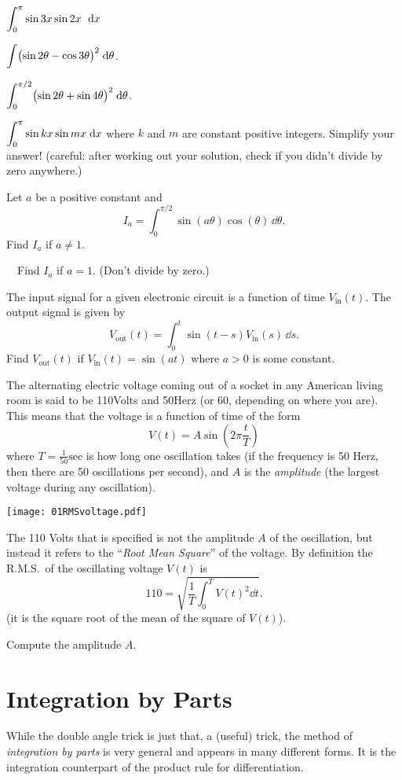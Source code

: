 \begin{multicols}{2}
\problem $\displaystyle \int_0^\pi \sin3x \sin 2x \ \;\mathrm{d} x$ %

\problem $\displaystyle \int \bigl(\sin 2\theta - \cos 3\theta\bigr)^2 \; \mathrm{d}\theta$. %

\problem $\DS\int_0^{\pi/2} \bigl(\sin 2\theta + \sin 4\theta\bigr)^2 \;\dd %
\theta$.

\problem $\displaystyle \int_0^\pi \sin kx \sin mx \;\mathrm{d} x$ where $k$ and $m$ are constant %
positive integers.  Simplify your answer!  (careful: after working out your
solution, check if you didn't divide by zero anywhere.)


\problem Let $a$ be a positive constant and %
\[
I_a = \int_0^{\pi/2} \sin(a\theta)\cos(\theta)\,\dd \theta.
\]
\subprob Find $I_a$ if $a\ne 1$.

\subprob \carefulnow~~Find $I_a$ if $a=1$. (Don't divide by zero.)


\problem \carefulnow The input signal for a given electronic circuit is a %
function of time $V_{\mathrm{in}}(t)$.  The output signal is given by
\[
V_{\mathrm{out}}(t) = \int_0^t \sin(t-s) V_{\mathrm{in}}(s) \,\dd s.
\]
Find $V_{\mathrm{out}}(t)$ if $V_{\mathrm{in}}(t) = \sin (at)$ where $a>0$ is
some constant.

\problem The alternating electric voltage coming out of a socket in any American %
living room is said to be 110Volts and 50Herz (or 60, depending on where you
are).  This means that the voltage is a function of time of the form
\[
V(t) = A \sin (2\pi \frac tT)
\]
where $T = \frac{1} {50} \mathrm{sec}$ is how long one oscillation takes
(if the frequency is 50 Herz, then there are 50 oscillations
per second), and $A$ is the \textit{amplitude} (the largest voltage during any
oscillation).

\texttt{[image: 01RMSvoltage.pdf]}

The 110 Volts that is specified is not the amplitude $A$ of the oscillation, but
instead it refers to the ``\textit{Root Mean Square}'' of the voltage.
By definition the R.M.S.~of the oscillating voltage $V(t)$ is
\[
110 = \sqrt{\frac{1}{T}\int_0^T V(t)^2 \dd t}.
\]
(it is the square root of the mean of the square of $V(t)$).

Compute the amplitude $A$.


\end{multicols}

\noproblemfont

\section{Integration by Parts}\label{sec:integration-by-parts} %
While the double angle trick is just that, a (useful) trick, the method of
\emph{integration by parts} is very general and appears in many different forms.
It is the integration counterpart of the product rule for differentiation.

